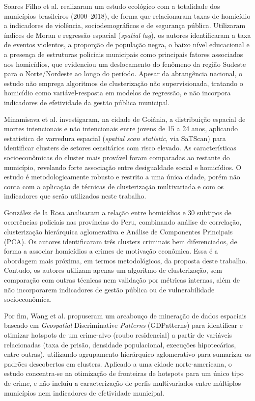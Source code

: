 \documentclass[12pt]{article}
\begin{document}
Soares Filho et al. \cite{soaresfilho2024} realizaram um estudo ecológico com a totalidade dos municípios brasileiros (2000--2018), de forma que relacionaram taxas de homicídio a indicadores de violência, sociodemográficos e de segurança pública. Utilizaram índices de Moran e regressão espacial (\textit{spatial lag}), os autores identificaram a taxa de eventos violentos, a proporção de população negra, o baixo nível educacional e a presença de estruturas policiais municipais como principais fatores associados aos homicídios, que evidenciou um deslocamento do fenômeno da região Sudeste para o Norte/Nordeste ao longo do período. Apesar da abrangência nacional, o estudo não emprega algoritmos de clusterização não supervisionada, tratando o homicídio como variável-resposta em modelos de regressão, e não incorpora indicadores de efetividade da gestão pública municipal.

Minamisava et al. \cite{minamisava2009} investigaram, na cidade de Goiânia, a distribuição espacial de mortes intencionais e não intencionais entre jovens de 15 a 24 anos, aplicando estatística de varredura espacial (\textit{spatial scan statistic}, via SaTScan) para identificar clusters de setores censitários com risco elevado. As características socioeconômicas do cluster mais provável foram comparadas ao restante do município, revelando forte associação entre desigualdade social e homicídios. O estudo é metodologicamente robusto e restrito a uma única cidade, porém não conta com a aplicação de técnicas de clusterização multivariada e com os indicadores que serão utilizados neste trabalho.

González de la Rosa \cite{gonzalez2026} analisaram a relação entre homicídios e 30 subtipos de ocorrências policiais nas províncias do Peru, combinando análise de correlação, clusterização hierárquica aglomerativa e Análise de Componentes Principais (PCA). Os autores identificaram três clusters criminais bem diferenciados, de forma a associar homicídios a crimes de motivação econômica. Essa é a abordagem mais próxima, em termos metodológicos, da proposta deste trabalho. Contudo, os autores utilizam apenas um algoritmo de clusterização, sem comparação com outras técnicas nem validação por métricas internas, além de não incorporarem indicadores de gestão pública ou de vulnerabilidade socioeconômica.

Por fim, Wang et al. \cite{wang2013} propuseram um arcabouço de mineração de dados espaciais baseado em \textit{Geospatial }Discriminative\textit{ Patterns} (GDPatterns) para identificar e otimizar hotspots de um crime-alvo (roubo residencial) a partir de variáveis relacionadas (taxa de prisão, densidade populacional, execuções hipotecárias, entre outras), utilizando agrupamento hierárquico aglomerativo para sumarizar os padrões descobertos em clusters. Aplicado a uma cidade norte-americana, o estudo concentra-se na otimização de fronteiras de hotspots para um único tipo de crime, e não incluiu a caracterização de perfis multivariados entre múltiplos municípios nem indicadores de efetividade municipal.
\end{document}
